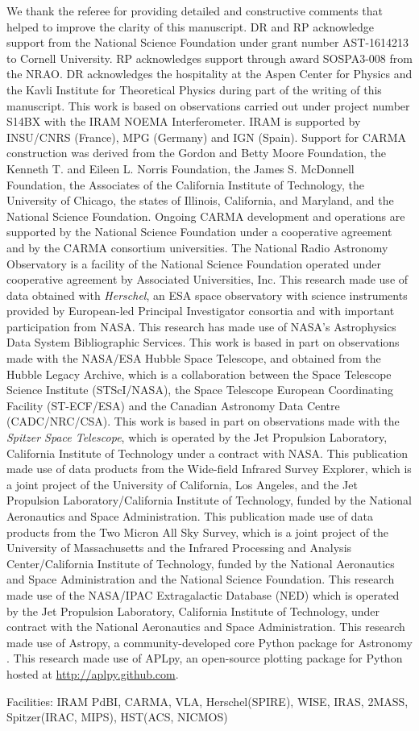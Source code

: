 \documentclass[]{emulateapj}
\def\spitzer {{\it Spitzer Space Telescope}\xspace}
\begin{document}
We thank the referee for providing detailed and constructive comments that helped to improve the clarity of this manuscript.
DR and RP acknowledge support from the National Science Foundation
under grant number AST-1614213 to Cornell University. RP acknowledges
support through award SOSPA3-008 from the NRAO. DR acknowledges the
hospitality at the Aspen Center for Physics and the Kavli Institute
for Theoretical Physics during part of the writing of this manuscript.
This work is based on observations carried out under project number S14BX
with the IRAM NOEMA Interferometer. IRAM is supported by INSU/CNRS (France), MPG (Germany) and IGN (Spain).
Support for CARMA construction was derived from the Gordon and Betty Moore
Foundation, the Kenneth T. and Eileen L. Norris Foundation, the James S.
McDonnell Foundation, the Associates of the California Institute of
Technology, the University of Chicago, the states of Illinois, California, and
Maryland, and the National Science Foundation. Ongoing CARMA development and
operations are supported by the National Science Foundation under a
cooperative agreement and by the CARMA consortium universities.
The National Radio Astronomy Observatory is a facility of the National Science
Foundation operated under cooperative agreement by Associated
Universities, Inc.
This research made use of data obtained with {\it Herschel}, an ESA space
observatory with science instruments provided by European-led Principal
Investigator consortia and with important participation from NASA.
This research has made use of NASA's Astrophysics Data System Bibliographic
Services.
This work is based in part on observations
made with the NASA/ESA Hubble Space Telescope, and obtained from the Hubble
Legacy Archive, which is a collaboration between the Space Telescope Science
Institute (STScI/NASA), the Space Telescope European Coordinating Facility
(ST-ECF/ESA) and the Canadian Astronomy Data Centre (CADC/NRC/CSA).
This work is based
in part on observations made with the \spitzer,
which is operated by the Jet Propulsion Laboratory, California Institute of
Technology under a contract with NASA.
This publication made use of data products from the Wide-field Infrared
Survey Explorer, which is a joint project of the University of California, Los
Angeles, and the Jet Propulsion Laboratory/California Institute of Technology,
funded by the National Aeronautics and Space Administration.
This publication made use of data products from the Two Micron All Sky
Survey, which is a joint project of the University of Massachusetts and the
Infrared Processing and Analysis Center/California Institute of Technology,
funded by the National Aeronautics and Space Administration and the National
Science Foundation.
This research made use of the NASA/IPAC Extragalactic Database (NED) which
is operated by the Jet Propulsion Laboratory, California Institute of
Technology, under contract with the National Aeronautics and Space
Administration.
This research made use of Astropy, a community-developed core Python package for Astronomy \citep{astropy}.
This research made use of APLpy, an open-source plotting package for Python hosted at \url{http://aplpy.github.com}.

Facilities: IRAM PdBI, CARMA, VLA, Herschel(SPIRE), WISE, IRAS, 2MASS, Spitzer(IRAC, MIPS), HST(ACS, NICMOS)






\end{document}
